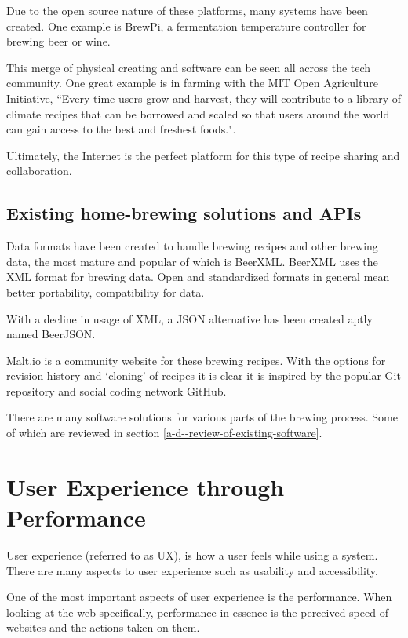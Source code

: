 Due to the open source nature of these platforms, many systems have been created. One example is BrewPi, a fermentation temperature controller for brewing beer or wine. \cite{brewpi}

This merge of physical creating and software can be seen all across the tech community. One great example is in farming with the MIT Open Agriculture Initiative, ``Every time users grow and harvest, they will contribute to a library of climate recipes that can be borrowed and scaled so that users around the world can gain access to the best and freshest foods.". \cite{climate_recipes}

Ultimately, the Internet is the perfect platform for this type of recipe sharing and collaboration.

\subsection{Existing home-brewing solutions and APIs} \label{l-r--exisiting-home-brewing-solutions}

Data formats have been created to handle brewing recipes and other brewing data, the most mature and popular of which is BeerXML. BeerXML uses the XML format for brewing data. \cite{beerxml} Open and standardized formats in general mean better portability, compatibility for data. %

With a decline in usage of XML, a JSON alternative has been created aptly named BeerJSON. \cite{beerjson} %

Malt.io is a community website for these brewing recipes. With the options for revision history and `cloning' of recipes it is clear it is inspired by the popular Git repository and social coding network GitHub. \cite{malt.io}

There are many software solutions for various parts of the brewing process. Some of which are reviewed in section \ref{a-d--review-of-existing-software}.

\section{User Experience through Performance} \label{l-r--user-experience-performance}

User experience (referred to as UX), is how a user feels while using a system. There are many aspects to user experience such as usability and accessibility. \cite{what_is_ux}

One of the most important aspects of user experience is the performance. When looking at the web specifically, performance in essence is the perceived speed of websites and the actions taken on them.

